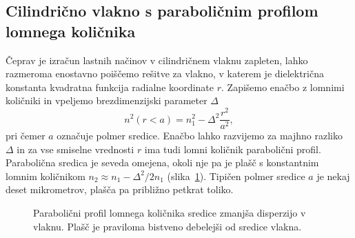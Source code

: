 \subsection*{Cilindrično vlakno s paraboličnim profilom lomnega količnika}
Čeprav je izračun lastnih načinov v cilindričnem vlaknu zapleten, lahko 
razmeroma enostavno poiščemo rešitve za vlakno, v katerem je dielektrična 
konstanta kvadratna funkcija radialne koordinate $r$. 
Zapišemo enačbo z lomnimi količniki
in vpeljemo brezdimenzijski parameter $\Delta$
\begin{equation}
n^2\left(r<a\right)=n_{1}^{2}- \Delta^2 \frac{r^2}{a^2},
\label{9.15}
\end{equation}
pri čemer $a$ označuje polmer sredice.
Enačbo lahko razvijemo za majhno razliko $\Delta$ in za vse smiselne vrednosti $r$
ima tudi lomni količnik parabolični profil. Parabolična
sredica je seveda omejena, okoli nje pa je plašč s konstantnim
lomnim količnikom $n_2 \approx n_1-\Delta^2/2n_1$ (slika~\ref{fig:GRIN}). 
Tipičen polmer sredice $a$ je nekaj deset mikrometrov, plašča pa približno petkrat toliko.
\begin{figure}[h]
\centering
\def\svgwidth{90truemm} 
 
\caption{Parabolični profil lomnega količnika sredice zmanjša disperzijo v vlaknu. Plašč
 je praviloma bistveno debelejši od sredice vlakna.}
\label{fig:GRIN}
\end{figure}

